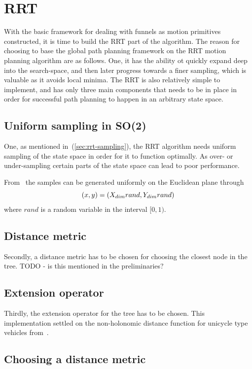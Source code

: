 \section{RRT}

With the basic framework for dealing with funnels as motion primitives
constructed, it is time to build the \ac{RRT} part of the \rrtfunnel{}
algorithm. The reason for choosing to base the global path planning framework on
the \ac{RRT} motion planning algorithm are as follows. One, it has the ability
ot quickly expand deep into the search-space, and then later progress towards a
finer sampling, which is valuable as it avoids local minima. The \ac{RRT} is
also relatively simple to implement, and has only three main components that
needs to be in place in order for successful path planning to happen in an
arbitrary state space.

\subsection{Uniform sampling in SO(2)}

One, as mentioned in~(\ref{sec:rrt-sampling}), the \ac{RRT} algorithm needs
uniform sampling of the state space in order for it to function optimally. As
over- or under-sampling certain parts of the state space can lead to poor
performance.

From~\cite{kuffnerEffectiveSamplingDistance2004} the samples can be generated
uniformly on the Euclidean plane through
\[
  (x,y) = (\mathnormal{X}_{dim}rand, \mathnormal{Y}_{dim}rand)
\]
where \(rand\) is a random variable in the interval \([0,1)\).

\subsection{Distance metric}

Secondly, a distance metric has to be chosen for choosing the closest node in
the tree. TODO - is this mentioned in the preliminaries?

\subsection{Extension operator}

Thirdly, the extension operator for the tree has to be chosen. This
implementation settled on the non-holonomic distance function for unicycle type
vehicles from~\cite{parkFeedbackMotionPlanning2015}.

\subsection{Choosing a distance metric}

